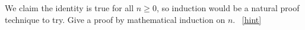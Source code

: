 \documentclass{book}
\begin{document}
\setcounter{project}{73}
\addtocounter{project}{-1}
\begin{activity}[]\label{activity-66}
\hypertarget{p-584}{}%
We claim the identity is true for all \(n \ge 0\), so induction would be a natural proof technique to try.  Give a proof by mathematical induction on \(n\).%
~\hfill{\tiny\hyperlink{a-73}{[hint]}\hypertarget{q-73}{}}\end{activity}
\end{document}
